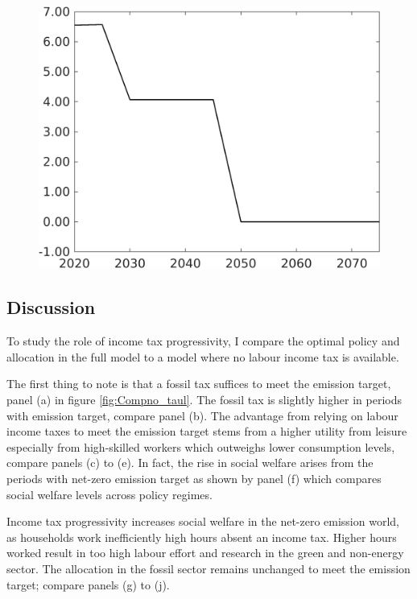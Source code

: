 \begin{figure}[h!!]
\begin{minipage}[]{0.32\textwidth}
\end{minipage}
\begin{minipage}[]{0.32\textwidth}
	\includegraphics[width=1\textwidth]{../../codding_model/own_basedOnFried/optimalPol_elastS_DisuSci/figures/all_1705/Single_OPT_T_NoTaus_Emnet_spillover0_sep1_BN0_ineq0_etaa0.79.png}
\end{minipage}
\end{figure} 

\subsection{Discussion}
To study the role of income tax progressivity, I compare the optimal policy and allocation in the full model to a  model where no labour income tax is available.

The first thing to note is that a fossil tax suffices to meet the emission target, panel (a) in figure \ref{fig:Compno_taul}. The fossil tax is slightly higher in periods with emission target, compare panel (b).
The advantage from relying on labour income taxes to meet the emission target stems from a higher utility from leisure especially from high-skilled workers which outweighs lower consumption levels, compare panels (c) to (e). In fact, the rise in social welfare arises from the periods with net-zero emission target as shown by panel (f) which compares social welfare levels across policy regimes. 

Income tax progressivity increases social welfare in the net-zero emission world, as households work inefficiently high hours absent an income tax. Higher hours worked result in too high labour effort and research in the green and non-energy sector. The allocation in the fossil sector remains unchanged to meet the emission target; compare panels (g) to (j). 

